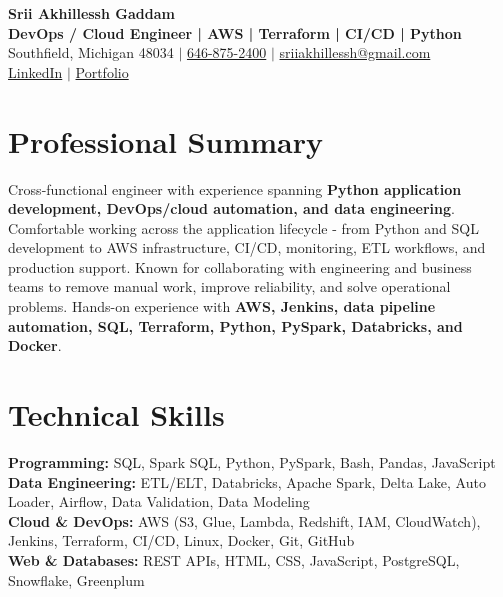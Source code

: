 \documentclass[letterpaper,10pt]{article}
\begin{document}
\fontsize{9.35pt}{10.45pt}\selectfont

\begin{center}
    {\LARGE \textbf{Srii Akhillessh Gaddam}} \\[-1pt]
    \textbf{DevOps / Cloud Engineer | AWS | Terraform | CI/CD | Python} \\[2pt]
    Southfield, Michigan 48034 $|$
    \href{tel:6468752400}{646-875-2400} $|$
    \href{mailto:sriiakhillessh@gmail.com}{sriiakhillessh@gmail.com} \\[1pt]
    \href{https://www.linkedin.com/in/srii-akhiilessh-gaddam-b48668191/}{LinkedIn} $|$
    \href{https://sriiakhillesshg.github.io/portfolio/}{Portfolio}
\end{center}
\vspace{-8pt}

\section{Professional Summary}
\small{Cross-functional engineer with experience spanning \textbf{Python application development, DevOps/cloud automation, and data engineering}. Comfortable working across the application lifecycle - from Python and SQL development to AWS infrastructure, CI/CD, monitoring, ETL workflows, and production support. Known for collaborating with engineering and business teams to remove manual work, improve reliability, and solve operational problems. Hands-on experience with \textbf{AWS, Jenkins, data pipeline automation, SQL, Terraform, Python, PySpark, Databricks, and Docker}.}

\section{Technical Skills}
\small{
\textbf{Programming:} SQL, Spark SQL, Python, PySpark, Bash, Pandas, JavaScript \\
\textbf{Data Engineering:} ETL/ELT, Databricks, Apache Spark, Delta Lake, Auto Loader, Airflow, Data Validation, Data Modeling \\
\textbf{Cloud \& DevOps:} AWS (S3, Glue, Lambda, Redshift, IAM, CloudWatch), Jenkins, Terraform, CI/CD, Linux, Docker, Git, GitHub \\
\textbf{Web \& Databases:} REST APIs, HTML, CSS, JavaScript, PostgreSQL, Snowflake, Greenplum
}
\end{document}
